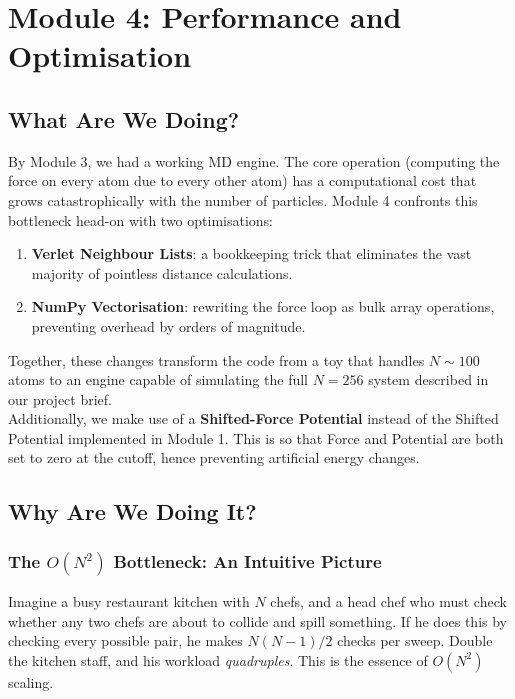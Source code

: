 
\newpage
\section{Module 4: Performance and Optimisation}

\subsection{What Are We Doing?}

By Module 3, we had a working MD engine. The core operation (computing the force on every atom due to every other atom) has a computational cost that grows catastrophically with the number of particles. Module 4 confronts this bottleneck head-on with two optimisations:

\begin{enumerate}
    \item \textbf{Verlet Neighbour Lists}: a bookkeeping trick that eliminates the vast majority of pointless distance calculations.
    \item \textbf{NumPy Vectorisation}: rewriting the force loop as bulk array operations, preventing overhead by orders of magnitude.
\end{enumerate}

Together, these changes transform the code from a toy that handles $N \sim 100$ atoms to an engine capable of simulating the full $N = 256$ system described in our project brief.\\[0.5em]
    Additionally, we make use of a \textbf{Shifted-Force Potential} instead of the Shifted Potential implemented in Module 1. This is so that Force and Potential are both set to zero at the cutoff, hence preventing artificial energy changes.

\subsection{Why Are We Doing It?}

\subsubsection{The \texorpdfstring{$O(N^2)$}{O(N²)} Bottleneck: An Intuitive Picture}

Imagine a busy restaurant kitchen with $N$ chefs, and a head chef who must check whether any two chefs are about to collide and spill something. If he does this by checking every possible pair, he makes $N(N-1)/2$ checks per sweep. Double the kitchen staff, and his workload \emph{quadruples}. This is the essence of $O(N^2)$ scaling.

